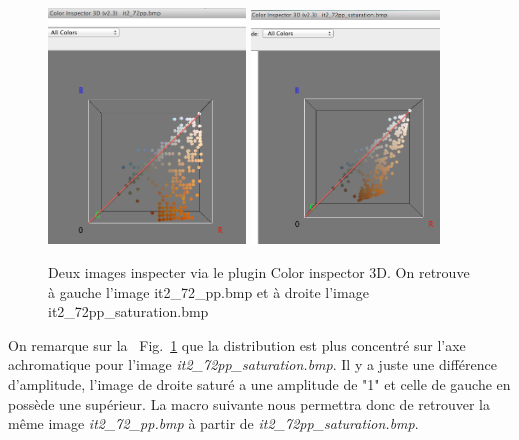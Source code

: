\documentclass[a4paper,10pt]{article}
\begin{document}
\begin{figure}[ht]
\begin{center}
	\includegraphics[width=5.25cm]{images/it2_72pp}
	\includegraphics[width=5cm]{images/it2_72pp_saturation}
\end{center}
	\caption{Deux images inspecter via le plugin Color inspector 3D. On retrouve \`a gauche l'image it2\_72\_pp.bmp et \`a droite l'image it2\_72pp\_saturation.bmp}
	\label{img3}
\end{figure}

On remarque sur la ~Fig.~\ref{img3} que la distribution est plus concentr\'e sur l'axe achromatique pour l'image \emph{it2\_72pp\_saturation.bmp}. Il y a juste une diff\'erence d'amplitude, l'image de droite satur\'e a une amplitude de "1" et celle de gauche en poss\`ede une sup\'erieur. La macro suivante nous permettra donc de retrouver la m\^eme image \emph{it2\_72\_pp.bmp} \`a partir de \emph{it2\_72pp\_saturation.bmp}.

\newpage
\end{document}
